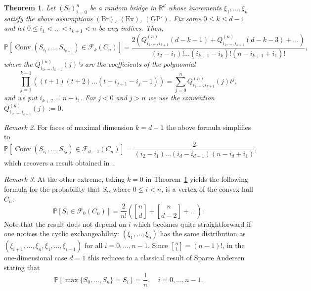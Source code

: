 \documentclass[12pt, reqno]{amsart}
\theoremstyle{plain}
\newtheorem{theorem}{Theorem}[section]
\theoremstyle{definition}
\theoremstyle{remark}
\newtheorem{remark}[theorem]{Remark}
\begin{document}
\begin{theorem}\label{1249bridge}
Let $(S_i)_{i=0}^n$ be a random bridge in ${\mathbb{R}}^d$ whose increments $\xi_1,\ldots,\xi_n$ satisfy the above assumptions $(\text{Br})$, $(\text{Ex})$, $(\text{GP}')$.
Fix some $0\leq k\leq d-1$ and let $0 \le i_1 < \ldots < i_{k+1}  < n$ be any indices. Then,
$$
{\mathbb{P}}[{\mathop{\mathrm{Conv}}\nolimits}(S_{i_1},\ldots,S_{i_{k+1}}) \in \mathcal F_k(C_n)]
=
\frac{
2(Q_{i_1,\ldots,i_{k+1}}^{(n)}(d-k-1) + Q_{i_1,\ldots,i_{k+1}}^{(n)}(d-k-3)+\ldots)
}{(i_2-i_1)!\ldots  (i_{k+1}-i_k)! (n-i_{k+1}+i_1)!},
$$
where the $Q_{i_1,\ldots,i_{k+1}}^{(n)}(j)$'s  are the coefficients of the polynomial
\begin{equation*}
\prod_{j=1}^{k+1} ((t+1)(t+2)\ldots (t+i_{j+1}-i_j-1)) = \sum_{j=0}^n Q_{i_1,\ldots,i_{k+1}}^{(n)}(j) t^j,
\end{equation*}
and we put $i_{k+2} = n+i_1$. For $j<0$ and $j>n$ we use the convention $Q_{i_1,\ldots,i_{k+1}}^{(n)}(j):=0$.
\end{theorem}
\begin{remark}
For faces of maximal dimension $k=d-1$ the above formula simplifies to
$$
{\mathbb{P}}[{\mathop{\mathrm{Conv}}\nolimits}(S_{i_1},\ldots,S_{i_{d}}) \in \mathcal F_{d-1}(C_n)]= \frac 2 {(i_2-i_1) \ldots (i_d - i_{d-1}) (n-i_d + i_1)},
$$
which recovers a result obtained in~\cite{vysotsky_zaporozhets}.
\end{remark}
\begin{remark}
At the other extreme, taking $k=0$ in Theorem~\ref{1249bridge} yields the following formula for the probability that $S_i$, where $0\leq i <n$, is a vertex of the convex hull $C_n$:
\begin{equation}\label{eq:exp_vertices_bridge}
{\mathbb{P}}[S_{i} \in \mathcal F_{0}(C_n)] = \frac 2 {n!} \left({\genfrac{[}{]}{0pt}{}{{n}}{{d}}} + {\genfrac{[}{]}{0pt}{}{{n}}{{d-2}}}+\ldots\right).
\end{equation}
Note that the result does not depend on $i$ which becomes quite straightforward  if one notices the cyclic exchangeability: $(\xi_1,\ldots,\xi_n)$ has the same distribution as $(\xi_{i+1},\ldots,\xi_n,\xi_1,\ldots,\xi_{i-1})$ for all $i=0,\ldots,n-1$.  Since ${\genfrac{[}{]}{0pt}{}{{n}}{{1}}} = (n-1)!$,  in the one-dimensional case $d=1$ this reduces to a classical result of Sparre Andersen stating that
$$
{\mathbb{P}}[\max\{S_0,\ldots,S_{n}\} = S_i]  = \frac 1 n, \quad i=0, \ldots, n-1.
$$
\end{remark}
\end{document}
